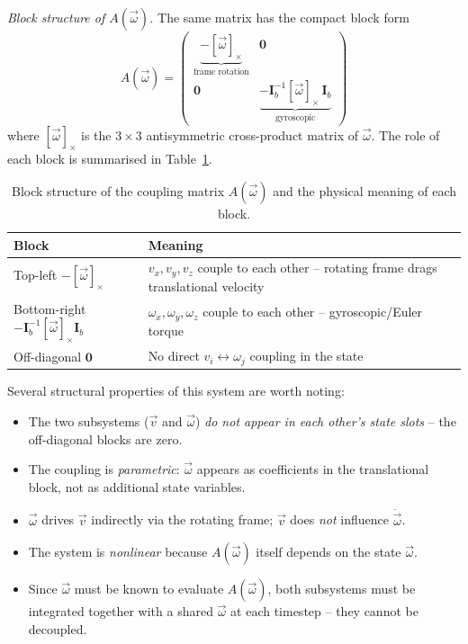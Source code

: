 \emph{Block structure of $A(\vec{\omega})$.}
The same matrix has the compact block form
\begin{equation}
    A(\vec{\omega}) =
    \begin{pmatrix}
        \underbrace{-[\vec{\omega}]_\times}_{\text{frame rotation}} &
        \mathbf{0} \\[4pt]
        \mathbf{0} &
        \underbrace{
            -\mathbf{I}_b^{-1}[\vec{\omega}]_\times\,\mathbf{I}_b
        }_{\text{gyroscopic}}
    \end{pmatrix}
    \label{eq:coupling_matrix_3d}
\end{equation}
where $[\vec{\omega}]_\times$ is the $3\times3$ antisymmetric cross-product matrix of
$\vec{\omega}$. The role of each block is summarised in Table~\ref{tab:block_structure}.

\begin{table}[h!]
\centering\small
\begin{tabular}{p{5.8cm}|p{6.9cm}}
\hline
Block & Meaning \\
\hline
Top-left $-[\vec{\omega}]_\times$ &
$v_x, v_y, v_z$ couple to each other -- rotating frame drags translational velocity
\\[4pt]
Bottom-right $-\mathbf{I}_b^{-1}[\vec{\omega}]_\times\mathbf{I}_b$ &
$\omega_x, \omega_y, \omega_z$ couple to each other -- gyroscopic/Euler torque
\\[4pt]
Off-diagonal $\mathbf{0}$ &
No direct $v_i \leftrightarrow \omega_j$ coupling in the state
\\
\hline
\end{tabular}
\caption{Block structure of the coupling matrix $A(\vec{\omega})$ and the physical
meaning of each block.}
\label{tab:block_structure}
\end{table}

Several structural properties of this system are worth noting:
\begin{itemize}
    \item The two subsystems ($\vec{v}$ and $\vec{\omega}$) \emph{do not appear in each
    other's state slots} -- the off-diagonal blocks are zero.
    \item The coupling is \emph{parametric}: $\vec{\omega}$ appears as coefficients in
    the translational block, not as additional state variables.
    \item $\vec{\omega}$ drives $\vec{v}$ indirectly via the rotating frame; $\vec{v}$
    does \emph{not} influence $\dot{\vec{\omega}}$.
    \item The system is \emph{nonlinear} because $A(\vec{\omega})$ itself depends on the
    state $\vec{\omega}$.
    \item Since $\vec{\omega}$ must be known to evaluate $A(\vec{\omega})$, both
    subsystems must be integrated together with a shared $\vec{\omega}$ at each
    timestep -- they cannot be decoupled.
\end{itemize}

